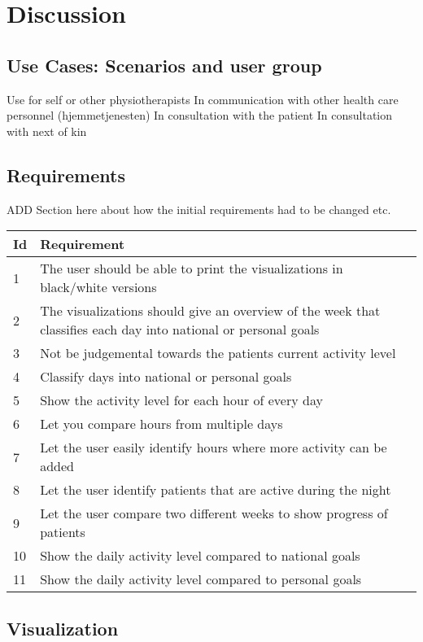 \chapter{Discussion}

\section{Use Cases: Scenarios and user group}
Use for self or other physiotherapists
In communication with other health care personnel (hjemmetjenesten)
In consultation with the patient
In consultation with next of kin 

\section{Requirements}
ADD Section here about how the initial requirements had to be changed etc.
\begin{table}[h!]
  \begin{center}
  \begin{tabular}{|l|p{12cm}|}
    \hline
      \textbf{Id} & \textbf{Requirement} \\ \hline
      1 & The user should be able to print the visualizations in black/white versions \\ \hline
      2 & The visualizations should give an overview of the week that classifies each day into national or personal goals \\ \hline
      3 & Not be judgemental towards the patients current activity level \\ \hline
      4 & Classify days into national or personal goals \\ \hline
      5 & Show the activity level for each hour of every day \\ \hline
      6 & Let you compare hours from multiple days \\ \hline
      7 & Let the user easily identify hours where more activity can be added \\ \hline
      8 & Let the user identify patients that are active during the night \\ \hline
      9 & Let the user compare two different weeks to show progress of patients \\ \hline
      10 & Show the daily activity level compared to national goals \\ \hline
      11 & Show the daily activity level compared to personal goals \\ \hline 
  \end{tabular}
  \end{center}
\end{table}
 
\section{Visualization}

